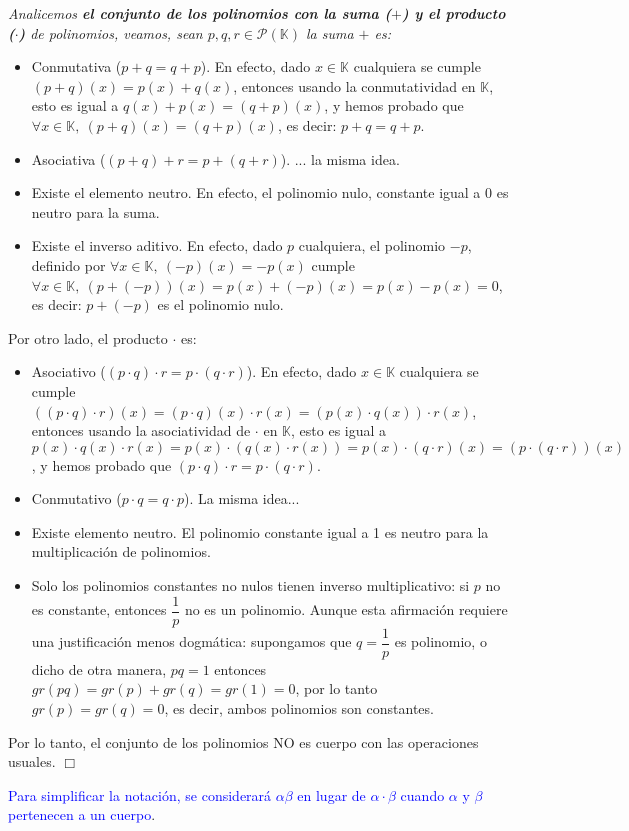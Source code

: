\documentclass[12pt]{book}
\def\K{\mathbb{K}}
\def\P{\mathcal{P}}
\begin{document}
{\em Analicemos {\bf el conjunto de los polinomios con la suma ($+$) y el producto ($\cdot$)} de polinomios, veamos, sean $p,q,r\in \P(\K)$ la suma $+$ es:
\begin{itemize}
\item Conmutativa ($p+q=q+p$). En efecto, dado $x\in\K$ cualquiera se cumple $(p+q)(x)=p(x)+q(x)$, entonces usando la conmutatividad en $\K$, esto es igual a $q(x)+p(x)=(q+p)(x)$, y hemos probado que $\forall x\in\K,\ (p+q)(x)=(q+p)(x)$, es decir: $p+q=q+p$.
\item Asociativa ($(p+q)+r=p+(q+r)$). ... la misma idea.
\item Existe el elemento neutro. En efecto, el polinomio nulo, constante igual a 0 es neutro para la suma.
\item Existe el inverso aditivo. En efecto, dado $p$ cualquiera, el polinomio $-p$, definido por $\forall x\in \K,\ (-p)(x)=-p(x)$ cumple $\forall x\in\K,\ (p+(-p))(x)=p(x)+(-p)(x)=p(x)-p(x)=0$, es decir: $p+(-p)$ es el polinomio nulo.
\end{itemize}
Por otro lado, el producto $\cdot$ es:
\begin{itemize}
\item Asociativo ($(p\cdot q)\cdot r=p\cdot(q\cdot r)$). En efecto, dado $x\in\K$ cualquiera se cumple $((p\cdot q)\cdot r)(x)=(p\cdot q)(x)\cdot r(x)=(p(x)\cdot q(x))\cdot r(x)$, entonces usando la asociatividad de $\cdot$ en $\K$, esto es igual a $p(x)\cdot q(x)\cdot r(x)=p(x)\cdot(q(x)\cdot r(x))=p(x)\cdot(q\cdot r)(x)=(p\cdot(q\cdot r))(x)$, y hemos probado que $(p\cdot q)\cdot r=p\cdot(q\cdot r)$.
\item Conmutativo ($p\cdot q=q\cdot p$). La misma idea...
\item Existe elemento neutro. El polinomio constante igual a 1 es neutro para la multiplicación de polinomios.
\item Solo los polinomios constantes no nulos tienen inverso multiplicativo: si $p$ no es constante, entonces $\dfrac{1}{p}$ no es un polinomio.
  Aunque esta afirmación requiere una justificación menos dogmática: supongamos que $q=\dfrac{1}{p}$ es polinomio, o dicho de otra manera, $pq=1$ entonces $gr(pq)=gr(p)+gr(q)=gr(1)=0$, por lo tanto $gr(p)=gr(q)=0$, es decir, ambos polinomios son constantes.
\end{itemize}
Por lo tanto, el conjunto de los polinomios NO es cuerpo con las operaciones usuales.
\hfill $\Box$}


\textcolor{blue}{Para simplificar la notaci\'on, se considerar\'a $\alpha \beta$ en lugar de $\alpha\cdot \beta$ cuando $\alpha$ y $\beta$ pertenecen a un cuerpo}.
\end{document}

